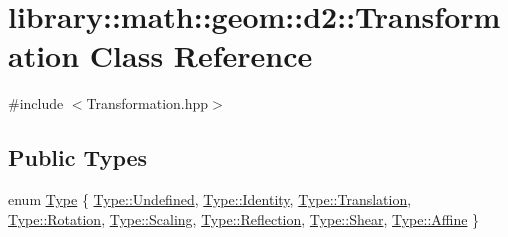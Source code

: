 \hypertarget{classlibrary_1_1math_1_1geom_1_1d2_1_1_transformation}{}\section{library\+:\+:math\+:\+:geom\+:\+:d2\+:\+:Transformation Class Reference}
\label{classlibrary_1_1math_1_1geom_1_1d2_1_1_transformation}


{\ttfamily \#include $<$Transformation.\+hpp$>$}

\subsection*{Public Types}
\begin{DoxyCompactItemize}
\item 
enum \hyperlink{classlibrary_1_1math_1_1geom_1_1d2_1_1_transformation_af2a94a7be48a51e9cc40f3075040d348}{Type} \{ \newline
\hyperlink{classlibrary_1_1math_1_1geom_1_1d2_1_1_transformation_af2a94a7be48a51e9cc40f3075040d348aec0fc0100c4fc1ce4eea230c3dc10360}{Type\+::\+Undefined}, 
\hyperlink{classlibrary_1_1math_1_1geom_1_1d2_1_1_transformation_af2a94a7be48a51e9cc40f3075040d348ac9c5c65fb4af9cf90eb99b3b84424189}{Type\+::\+Identity}, 
\hyperlink{classlibrary_1_1math_1_1geom_1_1d2_1_1_transformation_af2a94a7be48a51e9cc40f3075040d348a6dd08874f83507e9c7b23f1a46b7fa7c}{Type\+::\+Translation}, 
\hyperlink{classlibrary_1_1math_1_1geom_1_1d2_1_1_transformation_af2a94a7be48a51e9cc40f3075040d348af1a42bd417390fc63b030a519624607a}{Type\+::\+Rotation}, 
\newline
\hyperlink{classlibrary_1_1math_1_1geom_1_1d2_1_1_transformation_af2a94a7be48a51e9cc40f3075040d348abc967dc2d57e6eff184a821bf7577a80}{Type\+::\+Scaling}, 
\hyperlink{classlibrary_1_1math_1_1geom_1_1d2_1_1_transformation_af2a94a7be48a51e9cc40f3075040d348aaea1e492943ccbad7ee270ec1e064758}{Type\+::\+Reflection}, 
\hyperlink{classlibrary_1_1math_1_1geom_1_1d2_1_1_transformation_af2a94a7be48a51e9cc40f3075040d348a02414922b70cc0f9d7c841b0c70a0f94}{Type\+::\+Shear}, 
\hyperlink{classlibrary_1_1math_1_1geom_1_1d2_1_1_transformation_af2a94a7be48a51e9cc40f3075040d348a5b525aab6e200981a842101f1bcbafc6}{Type\+::\+Affine}
 \}
\end{DoxyCompactItemize}
